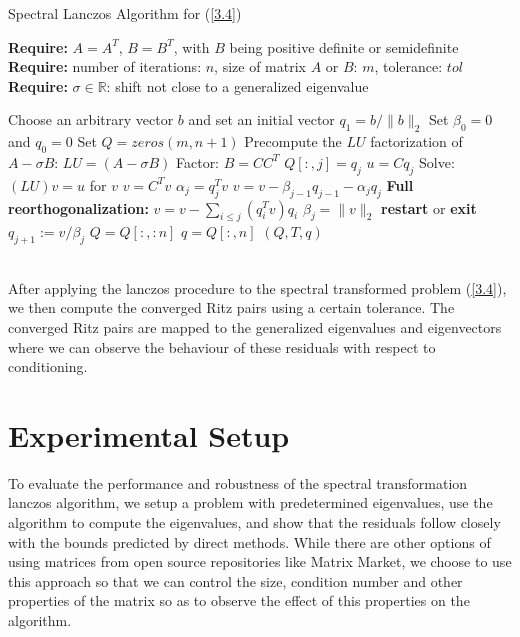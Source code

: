 \begin{algorithm}
	\caption{Spectral Lanczos Algorithm for (\ref{3.4}) }
	\label{alg:spectral_lanczos_algorithm}
	
	\textbf{Require:} \( A = A^T \), \( B = B^T \), with \(B\) being positive definite or semidefinite\\
	\textbf{Require:} number of iterations: \(n\), size of matrix $A$ or $B$: $m$, tolerance: \(tol\)\\
	\textbf{Require:} \(\sigma \in \mathbb{R}\): shift not close to a generalized eigenvalue
	\begin{algorithmic}[1]
		\State Choose an arbitrary vector $b$ and set an initial vector $q_1 = b/ \|b\|_2$
		\State Set $\beta_0 = 0$ and $q_0 = 0$
		\State Set $Q = zeros(m, n+1)$
		\State Precompute the $LU$ factorization of $A - \sigma B$: $LU = (A - \sigma B)$
		\State Factor: $B = CC^T$
		\State $Q[:, j] = q_j$
		\State $u = Cq_j$
		\State Solve: $(LU)v = u$ for $v$
		\State $v = C^T v$
		\State $\alpha_j = q_j^T v $
		\State $v = v - \beta_{j-1}q_{j-1} - \alpha_j q_j$
		\State \textbf{Full reorthogonalization:} $v = v - \sum_{i \leq j} (q_i^T v) q_i$
		\State $\beta_{j} = \|v\|_2$
		\State \textbf{restart} or \textbf{exit}
		\EndIf
		\State $q_{j+1} := v / \beta_{j}$
		\EndIf
		\EndFor
		\State $Q = Q[:, :n]$
		\State $q = Q[:, n]$
		\State \Return $(Q, T, q)$
		\EndFunction
	\end{algorithmic}
\end{algorithm}\\
After applying the lanczos procedure to the spectral transformed problem (\ref{3.4}), we then compute the converged Ritz pairs using a certain tolerance. The converged Ritz pairs are mapped to the generalized eigenvalues and eigenvectors where we can observe the behaviour of these residuals with respect to conditioning.
\section{Experimental Setup}
To evaluate the performance and robustness of the spectral transformation lanczos algorithm, we setup a problem with predetermined eigenvalues, use the algorithm to compute the eigenvalues, and show that the residuals follow closely with the bounds predicted by direct methods. While there are other options of using matrices from open source repositories like Matrix Market, we choose to use this approach so that we can control the size, condition number and other properties of the matrix so as to observe the effect of this properties on the algorithm.

